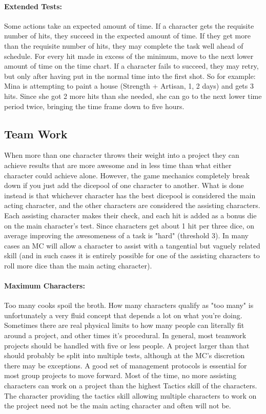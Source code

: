 \paragraph{Extended Tests:} Some actions take an expected amount of time. If a character gets the requisite number of hits, they succeed in the expected amount of time. If they get more than the requisite number of hits, they may complete the task well ahead of schedule. For every hit made in excess of the minimum, move to the next lower amount of time on the time chart. If a character fails to succeed, they may retry, but only after having put in the normal time into the first shot. So for example: Mina is attempting to paint a house (Strength + Artisan, 1, 2 days) and gets 3 hits. Since she got 2 more hits than she needed, she can go to the next lower time period twice, bringing the time frame down to five hours.

\subsection{Team Work} 

When more than one character throws their weight into a project they can achieve results that are more awesome and in less time than what either character could achieve alone. However, the game mechanics completely break down if you just add the dicepool of one character to another. What is done instead is that whichever character has the best dicepool is considered the main acting character, and the other characters are considered the assisting characters. Each assisting character makes their check, and each hit is added as a bonus die on the main character's test. Since characters get about 1 hit per three dice, on average improving the awesomeness of a task is "hard" (threshold 3). In many cases an MC will allow a character to assist with a tangential but vaguely related skill (and in such cases it is entirely possible for one of the assisting characters to roll more dice than the main acting character).

\paragraph{Maximum Characters:} Too many cooks spoil the broth. How many characters qualify as "too many" is unfortunately a very fluid concept that depends a lot on what you're doing. Sometimes there are real physical limits to how many people can literally fit around a project, and other times it's procedural. In general, most teamwork projects should be handled with five or less people. A project larger than that should probably be split into multiple tests, although at the MC's discretion there may be exceptions. A good set of management protocols is essential for most group projects to move forward. Most of the time, no more assisting characters can work on a project than the highest Tactics skill of the characters. The character providing the tactics skill allowing multiple characters to work on the project need not be the main acting character and often will not be.


